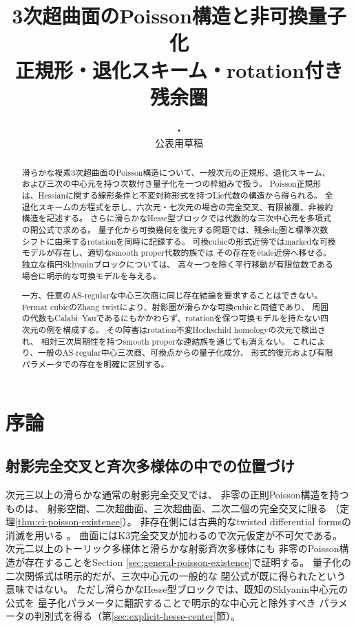 
\title{3次超曲面のPoisson構造と非可換量子化\\
\large 正規形・退化スキーム・rotation付き残余圏}
\author{}
\date{\DocDate・\DocVersion\\\small 公表用草稿}

\maketitle
\begin{abstract}
滑らかな複素3次超曲面のPoisson構造について、一般次元の正規形、退化スキーム、
および三次の中心元を持つ次数付き量子化を一つの枠組みで扱う。
Poisson正規形は、Hessianに関する線形条件と不変対称形式を持つLie代数の構造から得られる。
全退化スキームの方程式を示し、六次元・七次元の場合の完全交叉、有限被覆、非被約構造を記述する。
さらに滑らかなHesse型ブロックでは代数的な三次中心元を多項式の閉公式で求める。
量子化から可換幾何を復元する問題では、残余dg圏と標準次数シフトに由来するrotationを同時に記録する。
可換cubicの形式近傍ではmarkedな可換モデルが存在し、適切なsmooth proper代数的族では
その存在をétale近傍へ移せる。独立な楕円Sklyaninブロックについては、
高々一つを除く平行移動が有限位数である場合に明示的な可換モデルを与える。

一方、任意のAS-regularな中心三次商に同じ存在結論を要求することはできない。
Fermat cubicのZhang twistにより、射影圏が滑らかな可換cubicと同値であり、
周囲の代数もCalabi--Yauであるにもかかわらず、rotationを保つ可換モデルを持たない四次元の例を構成する。
その障害はrotation不変Hochschild homologyの次元で検出され、
相対三次周期性を持つsmooth properな連結族を通じても消えない。
これにより、一般のAS-regular中心三次商、可換点からの量子化成分、
形式的復元および有限パラメータでの存在を明確に区別する。
\end{abstract}
\tableofcontents

\section{序論}\label{sec:global-intro}

\subsection{射影完全交叉と斉次多様体の中での位置づけ}
次元三以上の滑らかな通常の射影完全交叉では、
非零の正則Poisson構造を持つものは、
射影空間、二次超曲面、三次超曲面、二次二個の完全交叉に限る
（定理\ref{thm:ci-poisson-existence}）。
非存在側には古典的なtwisted differential formsの消滅を用いる
\cite[Lemma 4.1]{FuHwangCI}。
曲面にはK3完全交叉が加わるので次元仮定が不可欠である。
次元二以上のトーリック多様体と滑らかな射影斉次多様体にも
非零のPoisson構造が存在することをSection
\ref{sec:general-poisson-existence}で証明する。
量子化の二次関係式は明示的だが、三次中心元の一般的な
閉公式が既に得られたという意味ではない。
ただし滑らかなHesse型ブロックでは、既知のSklyanin中心元の公式を
量子化パラメータに翻訳することで明示的な中心元と除外すべき
パラメータの判別式を得る（第\ref{sec:explicit-hesse-center}節）。


